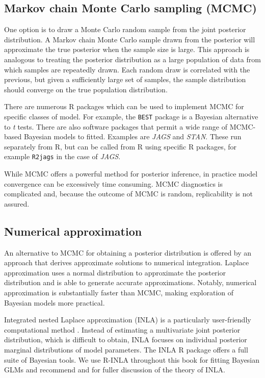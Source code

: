 \documentclass[
]{book}
\begin{document}
\hypertarget{mcmc}{%
\subsection{Markov chain Monte Carlo sampling (MCMC)}\label{mcmc}}

One option is to draw a Monte Carlo random sample from the joint posterior distribution. A Markov chain Monte Carlo sample drawn from the posterior will approximate the true posterior when the sample size is large. This approach is analogous to treating the posterior distribution as a large population of data from which samples are repeatedly drawn. Each random draw is correlated with the previous, but given a sufficiently large set of samples, the sample distribution should converge on the true population distribution.

There are numerous R packages which can be used to implement MCMC for specific classes of model. For example, the \texttt{BEST} package is a Bayesian alternative to \emph{t} tests. There are also software packages that permit a wide range of MCMC-based Bayesian models to fitted. Examples are \emph{JAGS} and \emph{STAN}. These run separately from R, but can be called from R using specific R packages, for example \texttt{R2jags} in the case of \emph{JAGS}.

While MCMC offers a powerful method for posterior inference, in practice model convergence can be excessively time consuming. MCMC diagnostics is complicated and, because the outcome of MCMC is random, replicability is not assured.

\hypertarget{inla}{%
\subsection{Numerical approximation}\label{inla}}

An alternative to MCMC for obtaining a posterior distribution is offered by an approach that derives approximate solutions to numerical integration. Laplace approximation uses a normal distribution to approximate the posterior distribution and is able to generate accurate approximations. Notably, numerical approximation is substantially faster than MCMC, making exploration of Bayesian models more practical.

Integrated nested Laplace approximation (INLA) is a particularly user-friendly computational method \citep{Rue_2009}. Instead of estimating a multivariate joint posterior distribution, which is difficult to obtain, INLA focuses on individual posterior marginal distributions of model parameters. The INLA R package offers a full suite of Bayesian tools. We use R-INLA throughout this book for fitting Bayesian GLMs and recommend \citet{Wang_2018} and \citet{G_mez_Rubio_2020} for fuller discussion of the theory of INLA.
\end{document}
